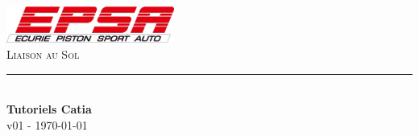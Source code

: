 \documentclass[]{article} %
\begin{document}
\begin{titlepage}
	
	\newcommand{\HRule}{\rule{\linewidth}{0.5mm}} %
	
	\center %
	    \includegraphics[height=1.2cm]{logo}
	\\[1cm]
	\textsc{\LARGE Liaison au Sol} 
	\HRule \\[0.4cm]
	{ \huge \bfseries Tutoriels Catia}  \\[1cm] %
	
	 {\large v01 - \today}\\[1cm] 
	\tableofcontents
	

\end{titlepage}



%

%

%

%



%
\end{document}
